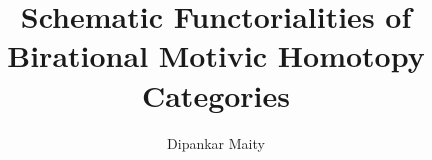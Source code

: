 \documentclass[12pt, a4paper, twoside]{article}
\title{Schematic Functorialities of \\Birational Motivic Homotopy Categories}
\author{Dipankar Maity}
\theoremstyle{mystyle}
\theoremstyle{spacedremark}
\theoremstyle{mystyle}
\begin{document}
\maketitle


		
    \renewcommand\refname{Bibliography}
    
	
\end{document}
